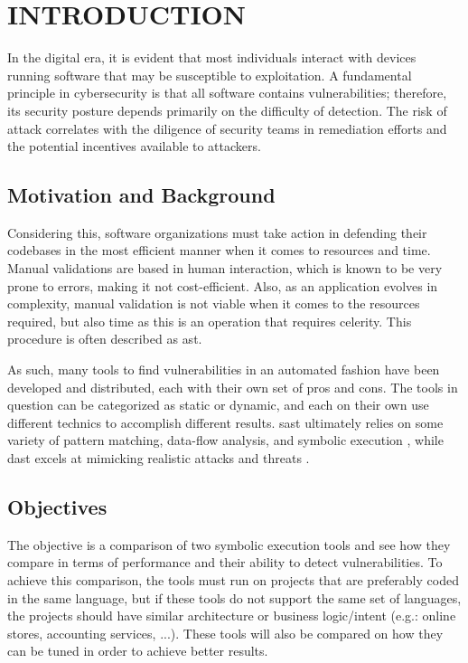 
\chapter{INTRODUCTION} \label{chap:intro}
In the digital era, it is evident that most individuals interact with devices running software that may be susceptible to exploitation. A fundamental principle in cybersecurity is that all software contains vulnerabilities; therefore, its security posture depends primarily on the difficulty of detection. The risk of attack correlates with the diligence of security teams in remediation efforts and the potential incentives available to attackers.

\section{Motivation and Background}
Considering this, software organizations must take action in defending their codebases in the most efficient manner when it comes to resources and time. Manual validations are based in human interaction, which is known to be very prone to errors, making it not cost-efficient. Also, as an application evolves in complexity, manual validation is not viable when it comes to the resources required, but also time as this is an operation that requires celerity. This procedure is often described as \acrfull{ast}.

As such, many tools to find vulnerabilities in an automated fashion have been developed and distributed, each with their own set of pros and cons. The tools in question can be categorized as static or dynamic, and each on their own use different technics to accomplish different results. \acrfull{sast} ultimately relies on some variety of pattern matching, data-flow analysis, and symbolic execution \citep{Croft2021}, while \acrfull{dast} excels at mimicking realistic attacks and threats \citep{DAST_description}.

\section{Objectives}\label{section:objectives}
The objective is a comparison of two symbolic execution tools and see how they compare in terms of performance and their ability to detect vulnerabilities. To achieve this comparison, the tools must run on projects that are preferably coded in the same language, but if these tools do not support the same set of languages, the projects should have similar architecture or business logic/intent (e.g.: online stores, accounting services, ...). These tools will also be compared on how they can be tuned in order to achieve better results.

